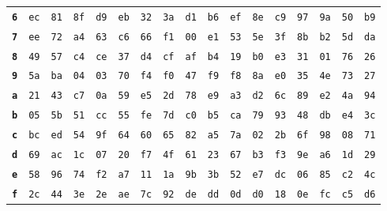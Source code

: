 \documentclass[11pt,a4paper]{article}
\begin{document}
\begin{center}
\begin{tabular}{@{}c|cccccccccccccccc@{}}
\textbf{\texttt{6}} & \texttt{ec} & \texttt{81} & \texttt{8f} & \texttt{d9} & \texttt{eb} & \texttt{32} & \texttt{3a} & \texttt{d1} & \texttt{b6} & \texttt{ef} & \texttt{8e} & \texttt{c9} & \texttt{97} & \texttt{9a} & \texttt{50} & \texttt{b9}\\
\textbf{\texttt{7}} & \texttt{ee} & \texttt{72} & \texttt{a4} & \texttt{63} & \texttt{c6} & \texttt{66} & \texttt{f1} & \texttt{00} & \texttt{e1} & \texttt{53} & \texttt{5e} & \texttt{3f} & \texttt{8b} & \texttt{b2} & \texttt{5d} & \texttt{da}\\
\textbf{\texttt{8}} & \texttt{49} & \texttt{57} & \texttt{c4} & \texttt{ce} & \texttt{37} & \texttt{d4} & \texttt{cf} & \texttt{af} & \texttt{b4} & \texttt{19} & \texttt{b0} & \texttt{e3} & \texttt{31} & \texttt{01} & \texttt{76} & \texttt{26}\\
\textbf{\texttt{9}} & \texttt{5a} & \texttt{ba} & \texttt{04} & \texttt{03} & \texttt{70} & \texttt{f4} & \texttt{f0} & \texttt{47} & \texttt{f9} & \texttt{f8} & \texttt{8a} & \texttt{e0} & \texttt{35} & \texttt{4e} & \texttt{73} & \texttt{27}\\
\textbf{\texttt{a}} & \texttt{21} & \texttt{43} & \texttt{c7} & \texttt{0a} & \texttt{59} & \texttt{e5} & \texttt{2d} & \texttt{78} & \texttt{e9} & \texttt{a3} & \texttt{d2} & \texttt{6c} & \texttt{89} & \texttt{e2} & \texttt{4a} & \texttt{94}\\
\textbf{\texttt{b}} & \texttt{05} & \texttt{5b} & \texttt{51} & \texttt{cc} & \texttt{55} & \texttt{fe} & \texttt{7d} & \texttt{c0} & \texttt{b5} & \texttt{ca} & \texttt{79} & \texttt{93} & \texttt{48} & \texttt{db} & \texttt{e4} & \texttt{3c}\\
\textbf{\texttt{c}} & \texttt{bc} & \texttt{ed} & \texttt{54} & \texttt{9f} & \texttt{64} & \texttt{60} & \texttt{65} & \texttt{82} & \texttt{a5} & \texttt{7a} & \texttt{02} & \texttt{2b} & \texttt{6f} & \texttt{98} & \texttt{08} & \texttt{71}\\
\textbf{\texttt{d}} & \texttt{69} & \texttt{ac} & \texttt{1c} & \texttt{07} & \texttt{20} & \texttt{f7} & \texttt{4f} & \texttt{61} & \texttt{23} & \texttt{67} & \texttt{b3} & \texttt{f3} & \texttt{9e} & \texttt{a6} & \texttt{1d} & \texttt{29}\\
\textbf{\texttt{e}} & \texttt{58} & \texttt{96} & \texttt{74} & \texttt{f2} & \texttt{a7} & \texttt{11} & \texttt{1a} & \texttt{9b} & \texttt{3b} & \texttt{52} & \texttt{e7} & \texttt{dc} & \texttt{06} & \texttt{85} & \texttt{c2} & \texttt{4c}\\
\textbf{\texttt{f}} & \texttt{2c} & \texttt{44} & \texttt{3e} & \texttt{2e} & \texttt{ae} & \texttt{7c} & \texttt{92} & \texttt{de} & \texttt{dd} & \texttt{0d} & \texttt{d0} & \texttt{18} & \texttt{0e} & \texttt{fc} & \texttt{c5} & \texttt{d6}\\
\end{tabular}
\end{center}
\end{document}
